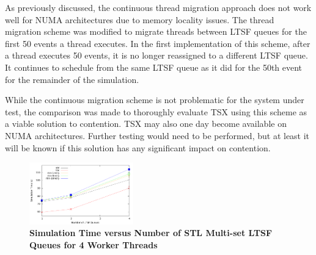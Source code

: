 \documentclass{sig-alternate}
\begin{document}
%
%

As previously discussed, the continuous thread migration approach does not work well for
NUMA architectures due to memory locality issues.  The thread migration scheme was
modified to migrate threads between LTSF queues for the first 50 events a thread executes.
In the first implementation of this scheme, after a thread executes 50 events, it is no
longer reassigned to a different LTSF queue.  It continues to schedule from the same LTSF
queue as it did for the 50th event for the remainder of the simulation.

While the continuous migration scheme is not problematic for the system under test, the
comparison was made to thoroughly evaluate TSX using this scheme as a viable solution to
contention.  TSX may also one day become available on NUMA architectures.  Further testing
would need to be performed, but at least it will be known if this solution has any
significant impact on contention.

\begin{figure}
    \centering
    \graphicspath{ {./figures/} }
    \includegraphics[width=0.4\textwidth,keepaspectratio]{hugeepidemicsim-XEVENTmig-timeVSschedQs-multiset-4thread}
    \caption{\textbf{Simulation Time versus Number of STL Multi-set LTSF Queues for 4
        Worker Threads}}\label{fig:xThrMig_timeVSschq_4threads}
\end{figure}
\end{document}
